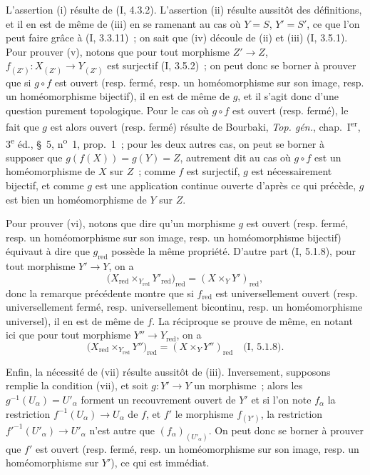 \documentclass[10pt,oneside]{book}
\newcommand{\oldpage}[2][]{%
  \setcounter{footnote}{0}%
  \marginpar{\scriptsize\textbf{#1}~|~#2}\ignorespaces}
\begin{document}
L'assertion (i) résulte de (I, 4.3.2). L'assertion (ii) résulte aussitôt des
définitions, et il en est de même de (iii) en se ramenant au cas où $Y=S$,
$Y'=S'$, ce que l'on peut faire grâce à (I, 3.3.11)~; on sait que (iv)
découle de (ii) et (iii) (I, 3.5.1). Pour prouver (v), notons que pour tout
morphisme $Z'\to Z$, $f_{(Z')}:X_{(Z')}\to Y_{(Z')}$ est surjectif
(I, 3.5.2)~; on peut donc se borner à prouver que si $g\circ f$ est ouvert
(resp. fermé, resp. un
\oldpage[IV-2]{20}
homéomorphisme sur son image, resp. un homéomorphisme bijectif), il en est de
même de $g$, et il s'agit donc d'une question purement topologique. Pour le
cas où $g\circ f$ est ouvert (resp. fermé), le fait que $g$ est alors ouvert
(resp. fermé) résulte de Bourbaki, \emph{Top. gén.}, chap.~I\textsuperscript{er},
3\textsuperscript{e} éd., \S~5, n\textsuperscript{o}~1, prop.~1~; pour les
deux autres cas, on peut se borner à supposer que
$g(f(X))=g(Y)=Z$, autrement dit au cas où $g\circ f$ est un homéomorphisme de
$X$ sur $Z$~; comme $f$ est surjectif, $g$ est nécessairement bijectif, et
comme $g$ est une application continue ouverte d'après ce qui précède, $g$
est bien un homéomorphisme de $Y$ sur $Z$.

Pour prouver (vi), notons que dire qu'un morphisme $g$ est ouvert (resp.
fermé, resp. un homéomorphisme sur son image, resp. un homéomorphisme
bijectif) équivaut à dire que $g_{\mathrm{red}}$ possède la même propriété.
D'autre part (I, 5.1.8), pour tout morphisme $Y'\to Y$, on a
\[
\bigl(X_{\mathrm{red}}\times_{Y_{\mathrm{red}}}Y'_{\mathrm{red}}\bigr)_{\mathrm{red}}
=(X\times_Y Y')_{\mathrm{red}},
\]
donc la remarque précédente montre que si $f_{\mathrm{red}}$ est
universellement ouvert (resp. universellement fermé, resp. universellement
bicontinu, resp. un homéomorphisme universel), il en est de même de $f$. La
réciproque se prouve de même, en notant ici que pour tout morphisme
$Y''\to Y_{\mathrm{red}}$, on a
\[
\bigl(X_{\mathrm{red}}\times_{Y_{\mathrm{red}}}Y''\bigr)_{\mathrm{red}}
=(X\times_Y Y'')_{\mathrm{red}}
\quad\text{(I, 5.1.8).}
\]

Enfin, la nécessité de (vii) résulte aussitôt de (iii). Inversement, supposons
remplie la condition (vii), et soit $g:Y'\to Y$ un morphisme~; alors les
$g^{-1}(U_\alpha)=U'_\alpha$ forment un recouvrement ouvert de $Y'$ et si
l'on note $f_\alpha$ la restriction $f^{-1}(U_\alpha)\to U_\alpha$ de $f$,
et $f'$ le morphisme $f_{(Y')}$, la restriction
$f'^{-1}(U'_\alpha)\to U'_\alpha$ n'est autre que
$(f_\alpha)_{(U'_\alpha)}$. On peut donc se borner à prouver que $f'$ est
ouvert (resp. fermé, resp. un homéomorphisme sur son image, resp. un
homéomorphisme sur $Y'$), ce qui est immédiat.
\end{document}
